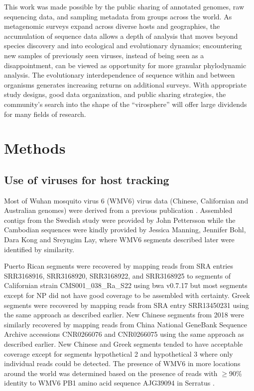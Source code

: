 \documentclass[11pt,twocolumn]{article}
\begin{document}
This work was made possible by the public sharing of annotated genomes, raw sequencing data, and sampling metadata from groups across the world. As metagenomic surveys expand across diverse hosts and geographies, the accumulation of sequence data allows a depth of analysis that moves beyond species discovery and into ecological and evolutionary dynamics; encountering new samples of previously seen viruses, instead of being seen as a disappointment, can be viewed as opportunity for more granular phylodynamic analysis. The evolutionary interdependence of sequence within and between organisms generates increasing returns on additional surveys. With appropriate study designs, good data organization, and public sharing strategies, the community's search into the shape of the ``virosphere'' will offer large dividends for many fields of research.


\section{Methods}

\subsection{Use of viruses for host tracking}

Most of Wuhan mosquito virus 6 (WMV6) virus data (Chinese, Californian and Australian genomes) were derived from a previous publication \citep{batson_single_2021}.
Assembled contigs from the Swedish study \citep{pettersson_meta-transcriptomic_2019} were provided by John Pettersson while the Cambodian sequences were kindly provided by Jessica Manning, Jennifer Bohl, Dara Kong and Sreyngim Lay, where WMV6 segments described later \citep{batson_single_2021} were identified by similarity.

Puerto Rican segments were recovered by mapping reads from SRA entries SRR3168916, SRR3168920, SRR3168922, and SRR3168925 \citep{frey_bioinformatic_2016} to segments of Californian strain CMS001\_038\_Ra\_S22 using bwa v0.7.17 \citep{li_fast_2009} but most segments except for NP did not have good coverage to be assembled with certainty.
Greek segments were recovered by mapping reads from SRA entry SRR13450231 \citep{konstantinidis_defining_2021} using the same approach as described earlier.
New Chinese segments from 2018 \citep{he_metagenomic_2021} were similarly recovered by mapping reads from China National GeneBank Sequence Archive accessions CNR0266076 and CNR0266075 using the same approach as described earlier.
New Chinese and Greek segments tended to have acceptable coverage except for segments hypothetical 2 and hypothetical 3 where only individual reads could be detected.
The presence of WMV6 in more locations around the world was determined based on the presence of reads with $\geq$90\% identity to WMV6 PB1 amino acid sequence AJG39094 in Serratus \citep{edgar_petabase-scale_2022}.
\end{document}
